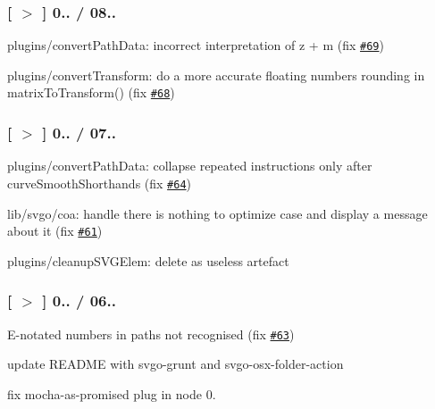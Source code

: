 \subsubsection*{\mbox{[} \href{https://github.com/svg/svgo/tree/v0.1.7}{\tt $>$} \mbox{]} 0.. / 08..}


\begin{DoxyItemize}
\item plugins/convert\+Path\+Data\+: incorrect interpretation of {\ttfamily z + m} (fix \href{https://github.com/svg/svgo/issues/69}{\tt \#69})
\item plugins/convert\+Transform\+: do a more accurate floating numbers rounding in {\ttfamily matrix\+To\+Transform()} (fix \href{https://github.com/svg/svgo/issues/68}{\tt \#68})
\end{DoxyItemize}

\subsubsection*{\mbox{[} \href{https://github.com/svg/svgo/tree/v0.1.6}{\tt $>$} \mbox{]} 0.. / 07..}


\begin{DoxyItemize}
\item plugins/convert\+Path\+Data\+: collapse repeated instructions only after curve\+Smooth\+Shorthands (fix \href{https://github.com/svg/svgo/issues/64}{\tt \#64})
\item lib/svgo/coa\+: handle \textquotesingle{}there is nothing to optimize\textquotesingle{} case and display a message about it (fix \href{https://github.com/svg/svgo/issues/61}{\tt \#61})
\item plugins/cleanup\+S\+V\+G\+Elem\+: delete as useless artefact
\end{DoxyItemize}

\subsubsection*{\mbox{[} \href{https://github.com/svg/svgo/tree/v0.1.5}{\tt $>$} \mbox{]} 0.. / 06..}


\begin{DoxyItemize}
\item E-\/notated numbers in paths not recognised (fix \href{https://github.com/svg/svgo/issues/63}{\tt \#63})
\item update R\+E\+A\+D\+ME with {\ttfamily svgo-\/grunt} and {\ttfamily svgo-\/osx-\/folder-\/action}
\item fix {\ttfamily mocha-\/as-\/promised} plug in node 0.
\end{DoxyItemize}


